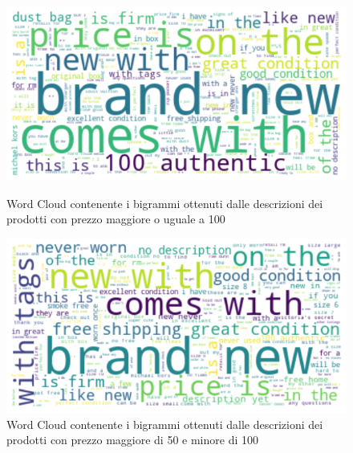 \begin{figure}[H]
   \begin{minipage}{0.48\textwidth}
     \centering
     \includegraphics[width=.9\linewidth]{maggiore_100}
	\caption{Word Cloud contenente i bigrammi ottenuti dalle descrizioni dei prodotti con prezzo maggiore o uguale a 100}
	\label{fig:100}   
	\end{minipage}\hfill
   \begin{minipage}{0.48\textwidth}
     \centering
     \includegraphics[width=.9\linewidth]{50_100}
     \caption{Word Cloud contenente i bigrammi ottenuti dalle descrizioni dei prodotti con prezzo maggiore di 50 e minore di 100}
     \label{Fig:50_100}
   \end{minipage}
\end{figure}

